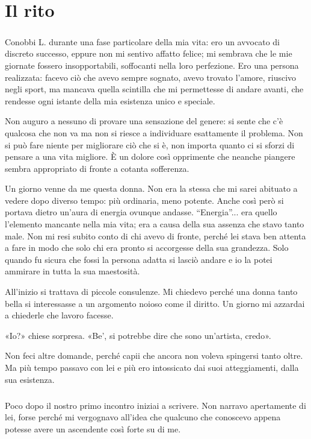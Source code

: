 \documentclass[a4paper,12pt]{book}
\begin{document}
\chapter{Il rito}

\paragraph{}
Conobbi L. durante una fase particolare della mia vita: ero un avvocato di
discreto successo, eppure non mi sentivo affatto felice; mi sembrava che le mie
giornate fossero insopportabili, soffocanti nella loro perfezione. Ero una
persona realizzata: facevo ciò che avevo sempre sognato, avevo trovato l'amore,
riuscivo negli sport, ma mancava quella scintilla che mi permettesse di andare
avanti, che rendesse ogni istante della mia esistenza unico e speciale.

Non auguro a nessuno di provare una sensazione del genere: si sente che c'è
qualcosa che non va ma non si riesce a individuare esattamente il problema. Non
si può fare niente per migliorare ciò che si è, non importa quanto ci si
sforzi di pensare a una vita migliore. È un dolore così opprimente che neanche
piangere sembra appropriato di fronte a cotanta sofferenza.

Un giorno venne da me questa donna. Non era la stessa che mi sarei abituato a
vedere dopo diverso tempo: più ordinaria, meno potente. Anche così però si
portava dietro un'aura di energia ovunque andasse. ``Energia''... era quello
l'elemento mancante nella mia vita; era a causa della sua assenza che stavo
tanto male. Non mi resi subito conto di chi avevo di fronte, perché lei stava
ben attenta a fare in modo che solo chi era pronto si accorgesse della sua
grandezza. Solo quando fu sicura che fossi la persona adatta si lasciò andare
e io la potei ammirare in tutta la sua maestosità.

All'inizio si trattava di piccole consulenze. Mi chiedevo perché una donna
tanto bella si interessasse a un argomento noioso come il diritto. Un giorno mi
azzardai a chiederle che lavoro facesse.

«Io?» chiese sorpresa. «Be', si potrebbe dire che sono un'artista, credo».

Non feci altre domande, perché capii che ancora non voleva spingersi tanto
oltre. Ma più tempo passavo con lei e più ero intossicato dai suoi
atteggiamenti, dalla sua esistenza.

\paragraph{}
Poco dopo il nostro primo incontro iniziai a scrivere. Non narravo apertamente
di lei, forse perché mi vergognavo all'idea che qualcuno che conoscevo appena
potesse avere un ascendente così forte su di me.
\end{document}
